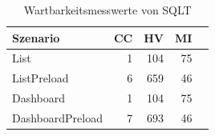 \begin{table}[ht]
\centering
\caption{Wartbarkeitsmesswerte von SQLT}
\begin{tabular}{lrrrr}
\toprule
Szenario & CC & HV & MI \\
\midrule
	List & 1 & 104 & 75 \\
	ListPreload & 6 & 659 & 46 \\
	Dashboard & 1 & 104 & 75 \\
	DashboardPreload & 7 & 693 & 46 \\
\bottomrule
\end{tabular}
\label{tab:wartbarkeit_sqlt}
\end{table}
	